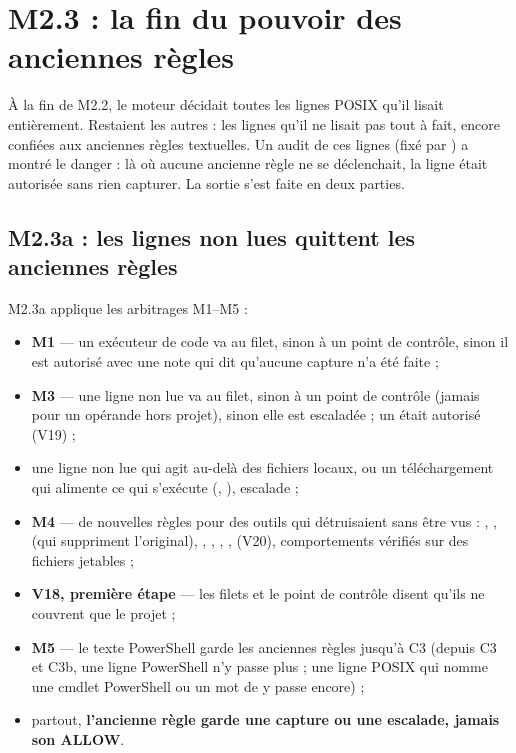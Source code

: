 \section{M2.3 : la fin du pouvoir des anciennes règles}
\label{sec:m23a}

À la fin de M2.2, le moteur décidait toutes les lignes POSIX qu'il lisait entièrement. Restaient
les autres : les lignes qu'il ne lisait pas tout à fait, encore confiées aux anciennes règles
textuelles. Un audit de ces lignes (fixé par ) a montré le danger : là où
aucune ancienne règle ne se déclenchait, la ligne était autorisée sans rien capturer. La sortie
s'est faite en deux parties.

\subsection{M2.3a : les lignes non lues quittent les anciennes règles}
M2.3a applique les arbitrages M1--M5 :

\begin{itemize}
  \item \textbf{M1} --- un exécuteur de code va au filet, sinon à un point de contrôle, sinon il
    est autorisé avec une note qui dit qu'aucune capture n'a été faite ;
  \item \textbf{M3} --- une ligne non lue va au filet, sinon à un point de contrôle (jamais pour un
    opérande hors projet), sinon elle est escaladée ; un  était
    autorisé (V19) ;
  \item une ligne non lue qui agit au-delà des fichiers locaux, ou un téléchargement qui
    alimente ce qui s'exécute (, ),
    escalade ;
  \item \textbf{M4} --- de nouvelles règles pour des outils qui détruisaient sans être vus :
    , ,  (qui suppriment l'original), ,
    , , ,  (V20), comportements vérifiés
    sur des fichiers jetables ;
  \item \textbf{V18, première étape} --- les filets et le point de contrôle disent qu'ils ne
    couvrent que le projet ;
  \item \textbf{M5} --- le texte PowerShell garde les anciennes règles jusqu'à C3 (depuis C3
    et C3b, une ligne PowerShell n'y passe plus ; une ligne POSIX qui nomme une cmdlet
    PowerShell ou un mot de  y passe encore) ;
  \item partout, \textbf{l'ancienne règle garde une capture ou une escalade, jamais son ALLOW}.
\end{itemize}

